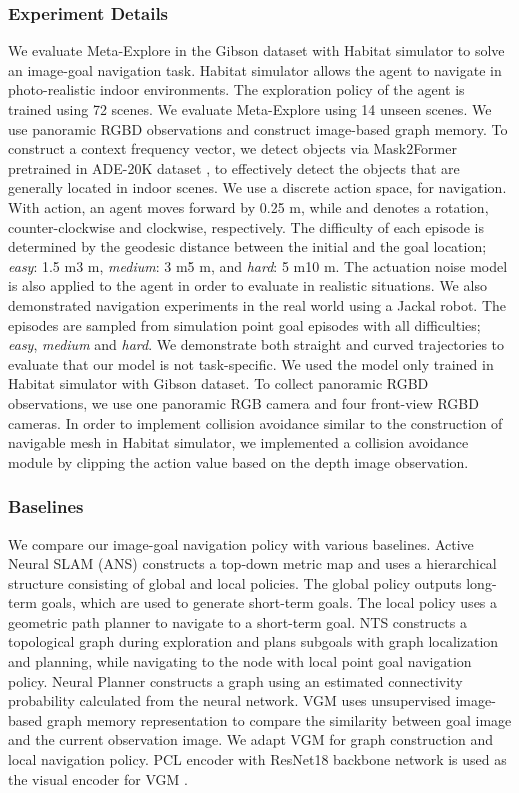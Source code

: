 \documentclass[10pt,twocolumn,letterpaper]{article}
\begin{document}
\subsubsection{Experiment Details}
We evaluate Meta-Explore in the Gibson dataset \cite{xia2018gibson} with Habitat \cite{szot2021habitat} simulator to solve an image-goal navigation task. Habitat simulator allows the agent to navigate in photo-realistic indoor environments. The exploration policy of the agent is trained using 72 scenes. We evaluate Meta-Explore using 14 unseen scenes. We use panoramic RGBD observations and construct image-based graph memory. To construct a context frequency vector, we detect objects via Mask2Former \cite{cheng2021mask2former} pretrained in ADE-20K dataset \cite{zhou2017scene}, to effectively detect the objects that are generally located in indoor scenes. We use a discrete action space,  for navigation. With  action, an agent moves forward by 0.25 m, while  and  denotes a  rotation, counter-clockwise and clockwise, respectively. The difficulty of each episode is determined by the geodesic distance between the initial and the goal location; \textit{easy}: 1.5 m3 m, \textit{medium}: 3 m5 m, and \textit{hard}: 5 m10 m. The actuation noise model \cite{chaplot2020Learning} is also applied to the agent in order to evaluate in realistic situations. We also demonstrated navigation experiments in the real world using a Jackal robot. The episodes are sampled from simulation point goal episodes with all difficulties; \textit{easy}, \textit{medium} and \textit{hard}. We demonstrate both straight and curved trajectories to evaluate that our model is not task-specific. We used the model only trained in Habitat simulator with Gibson dataset. To collect panoramic RGBD observations, we use one panoramic RGB camera and four front-view RGBD cameras. In order to implement collision avoidance similar to the construction of navigable mesh in Habitat simulator, we implemented a collision avoidance module by clipping the action value based on the depth image observation.
\subsubsection{Baselines}
We compare our image-goal navigation policy with various baselines.
Active Neural SLAM (ANS) constructs a top-down metric map and uses a hierarchical structure consisting of global and local policies. The global policy outputs long-term goals, which are used to generate short-term goals. The local policy uses a geometric path planner to navigate to a short-term goal. NTS \cite{neuralslam} constructs a topological graph during exploration and plans subgoals with graph localization and planning, while navigating to the node with local point goal navigation policy. Neural Planner \cite{beeching2020learning} constructs a graph using an estimated connectivity probability calculated from the neural network.  VGM \cite{vgm} uses unsupervised image-based graph memory representation to compare the similarity between goal image and the current observation image. We adapt VGM for graph construction and local navigation policy. PCL \cite{li2020prototypical} encoder with ResNet18 \cite{he2016deep} backbone network is used as the visual encoder for VGM \cite{vgm}.
\end{document}
